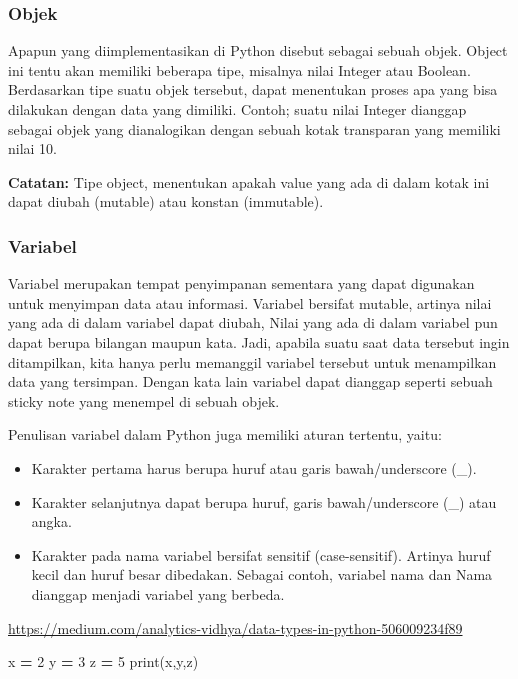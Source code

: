 \documentclass[
]{docs}
\newenvironment{Shaded}{\begin{snugshade}}{\end{snugshade}}
\newcommand{\BuiltInTok}[1]{#1}
\newcommand{\DecValTok}[1]{\textcolor[rgb]{0.00,0.00,0.81}{#1}}
\newcommand{\NormalTok}[1]{#1}
\newcommand{\OperatorTok}[1]{\textcolor[rgb]{0.81,0.36,0.00}{\textbf{#1}}}
\providecommand{\tightlist}{%
  \setlength{\itemsep}{0pt}\setlength{\parskip}{0pt}}
\begin{document}
\hypertarget{objek}{%
\subsubsection{Objek}\label{objek}}

Apapun yang diimplementasikan di Python disebut sebagai sebuah objek. Object ini tentu akan memiliki beberapa tipe, misalnya nilai Integer atau Boolean. Berdasarkan tipe suatu objek tersebut, dapat menentukan proses apa yang bisa dilakukan dengan data yang dimiliki. Contoh; suatu nilai Integer dianggap sebagai objek yang dianalogikan dengan sebuah kotak transparan yang memiliki nilai 10.

\textbf{Catatan:} Tipe object, menentukan apakah value yang ada di dalam kotak ini dapat diubah (mutable) atau konstan (immutable).

\hypertarget{variabel}{%
\subsubsection{Variabel}\label{variabel}}

Variabel merupakan tempat penyimpanan sementara yang dapat digunakan untuk menyimpan data atau informasi. Variabel bersifat mutable, artinya nilai yang ada di dalam variabel dapat diubah, Nilai yang ada di dalam variabel pun dapat berupa bilangan maupun kata. Jadi, apabila suatu saat data tersebut ingin ditampilkan, kita hanya perlu memanggil variabel tersebut untuk menampilkan data yang tersimpan. Dengan kata lain variabel dapat dianggap seperti sebuah sticky note yang menempel di sebuah objek.

Penulisan variabel dalam Python juga memiliki aturan tertentu, yaitu:

\begin{itemize}
\tightlist
\item
  Karakter pertama harus berupa huruf atau garis bawah/underscore (\_).
\item
  Karakter selanjutnya dapat berupa huruf, garis bawah/underscore (\_) atau angka.
\item
  Karakter pada nama variabel bersifat sensitif (case-sensitif). Artinya huruf kecil dan huruf besar dibedakan. Sebagai contoh, variabel nama dan Nama dianggap menjadi variabel yang berbeda.
\end{itemize}

\url{https://medium.com/analytics-vidhya/data-types-in-python-506009234f89}

\begin{Shaded}
\begin{Highlighting}[]
\NormalTok{x }\OperatorTok{=} \DecValTok{2}
\NormalTok{y }\OperatorTok{=} \DecValTok{3} 
\NormalTok{z }\OperatorTok{=} \DecValTok{5} 
\BuiltInTok{print}\NormalTok{(x,y,z)}
\end{Highlighting}
\end{Shaded}
\end{document}
